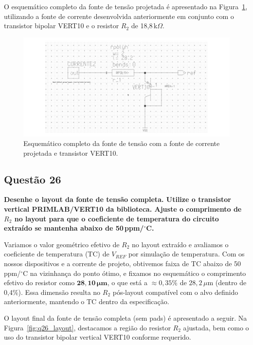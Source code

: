 \documentclass[12pt,a4paper]{article}
\newcommand{\degree}{\ensuremath{{}^\circ}}
\begin{document}
O esquemático completo da fonte de tensão projetada é apresentado na Figura~\ref{fig:esquematico25}, utilizando a fonte de corrente desenvolvida anteriormente em conjunto com o transistor bipolar VERT10 e o resistor $R_2$ de 18{,}8\,k$\Omega$.

\begin{figure}[H]
    \centering
    \includegraphics[width=1\textwidth]{esquematico25.png}
    \caption{Esquemático completo da fonte de tensão com a fonte de corrente projetada e transistor VERT10.}
    \label{fig:esquematico25}
\end{figure}



\subsection*{Questão 26}

	\textbf{Desenhe o layout da fonte de tensão completa. Utilize o transistor vertical PRIMLAB/VERT10 da biblioteca. Ajuste o comprimento de $R_2$ no layout para que o coeficiente de temperatura do circuito extraído se mantenha abaixo de 50\,ppm/\degree C.}

Variamos o valor geométrico efetivo de $R_2$ no layout extraído e avaliamos o coeficiente de temperatura (TC) de $V_{REF}$ por simulação de temperatura. Com os nossos dispositivos e a corrente de projeto, obtivemos faixa de TC abaixo de 50\,ppm/\degree C na vizinhança do ponto ótimo, e fixamos no esquemático o comprimento efetivo do resistor como $\mathbf{28{,}10\,\mu\text{m}}$, o que está a $\approx 0{,}35\%$ de $28{,}2\,\mu\text{m}$ (dentro de 0{,}4\%). Essa dimensão resulta no $R_2$ pós-layout compatível com o alvo definido anteriormente, mantendo o TC dentro da especificação.

O layout final da fonte de tensão completa (sem pads) é apresentado a seguir. Na Figura~\ref{fig:q26_layout}, destacamos a região do resistor $R_2$ ajustada, bem como o uso do transistor bipolar vertical VERT10 conforme requerido.
\end{document}
